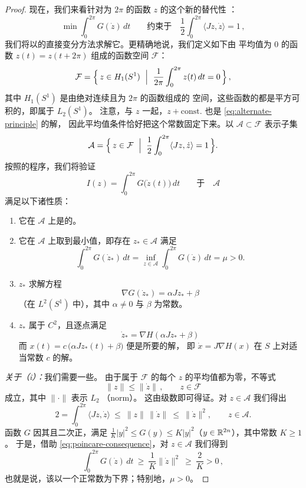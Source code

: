 \begin{proof}
现在，我们来看针对\trPeriodic{}为 $2\pi$ 的函数 $z$ 的这个新的替代性%
\trVariationalPrinciple：
\begin{equation}\label{eq:alternate-principle}
\min\int_{0}^{2\pi}G(\dot{z})\,dt\qquad\text{约束于}\quad
\frac{1}{2}\int_{0}^{2\pi}\langle Jz,\dot{z}\rangle=1\,,
\end{equation}
我们将以\trStandard{}的直接变分方法求解它。更精确地说，我们定义如下由%
平均值为 $0$ 的\trPeriodic{}函数 $z(t)=z(t+2\pi)$ 组成的函数空间 $\mathcal{F}$：
\[
\mathcal{F}=\Bigl\{\,z\in H_{1}(S^{1})\ \Bigm|\ \frac{1}{2\pi}\int_{0}^{2\pi}z(t)\,dt=0\,\Bigr\}\,,
\]
其中 $H_{1}(S^{1})$ 是由绝对连续且\trPeriodic{}为 $2\pi$ 的函数组成的%
\trHilbert{}空间，这些函数的\trDerivative{}都是平方可积的，即属于 $L_{2}(S^{1})$。%
注意，与 $z$ 一起，$z+\mathrm{const.}$ 也是 \eqref{eq:alternate-principle} 的解，%
因此平均值条件恰好把这个常数固定下来。以 $\mathcal{A}\subset\mathcal{F}$ 表示子集
\[
\mathcal{A}=\Bigl\{\,z\in\mathcal{F}\ \Bigm|\ \frac{1}{2}\int_{0}^{2\pi}\langle Jz,\dot{z}\rangle=1\,\Bigr\}.
\]
按照\trStandard{}的程序，我们将验证\trFunctional
\[
I(z)=\int_{0}^{2\pi}G\bigl(\dot{z}(t)\bigr)\,dt\qquad\text{于}\quad\mathcal{A}
\]
满足以下诸性质：
\begin{enumerate}[label=(\roman*)]
\item 它在 $\mathcal{A}$ 上是\trBoundedBelow{}的。
\item 它在 $\mathcal{A}$ 上取到最小值，即存在 $z_{*}\in\mathcal{A}$ 满足
\[
\int_{0}^{2\pi}G(\dot{z}_{*})\,dt=\inf_{z\in\mathcal{A}}\int_{0}^{2\pi}G(\dot{z})\,dt=\mu>0.
\]
\item $z_{*}$ 求解\trEuler{}方程
\[
\nabla G(\dot{z}_{*})=\alpha Jz_{*}+\beta
\]
（在 $L^{2}(S^{1})$ 中），其中 $\alpha\neq0$ 与 $\beta$ 为常数。
\item $z_{*}$ 属于 $C^{2}$，且逐点满足
\[
\dot{z}_{*}=\nabla H(\alpha Jz_{*}+\beta)
\]
而 $x(t)=c\,\bigl(\alpha Jz_{*}(t)+\beta\bigr)$ 便是所要的解，%
即 $\dot{x}=J\nabla H(x)$ 在 $S$ 上对适当常数 $c$ 的解。
\end{enumerate}

\medskip
\noindent\emph{关于（i）：}我们需要一些\trEstimate。%
由于属于 $\mathcal{F}$ 的每个 $z$ 的平均值都为零，\trPoincare{}不等式
\[
\|z\|\leq\|\dot{z}\|\,,\qquad z\in\mathcal{F}
\]
成立，其中 $\|\cdot\|$ 表示 $L_{2}$ \textbf{\trNorm}（norm）。%
这由\trFourier{}级数即可得证。对 $z\in\mathcal{A}$ 我们得出
\begin{equation}\label{eq:poincare-consequence}
2=\int_{0}^{2\pi}\langle Jz,\dot{z}\rangle\ \leq\ \|z\|\,\|\dot{z}\|\ \leq\ \|\dot{z}\|^{2},\qquad z\in\mathcal{A}.
\end{equation}
函数 $G$ 因其\trStrictlyConvex{}且二次正\trHomogeneous，满足\trEstimate{}%
$\frac{1}{K}|y|^{2}\leq G(y)\leq K|y|^{2}$（$y\in\mathbb{R}^{2n}$），其中常数 $K\geq1$。%
于是，借助 \eqref{eq:poincare-consequence}，对 $z\in\mathcal{A}$ 我们得到
\begin{equation}\label{eq:functional-lower-bound}
\int_{0}^{2\pi}G(\dot{z})\,dt\ \geq\ \frac{1}{K}\|\dot{z}\|^{2}\ \geq\ \frac{2}{K}>0\,,
\end{equation}
也就是说，该\trFunctional{}以一个正常数为下界；特别地，$\mu>0$。


\end{proof}
